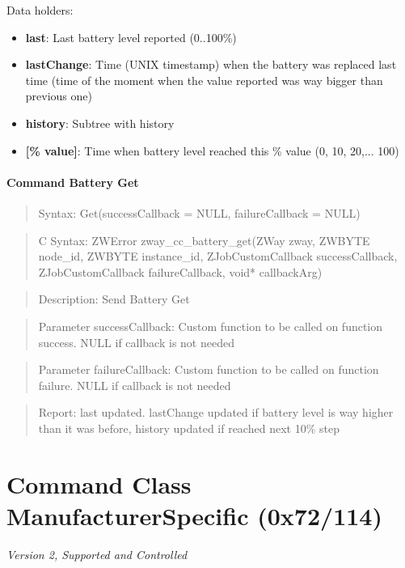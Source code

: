\noindent
Data holders:

\begin{itemize}
\item \textbf{last}: Last battery level reported (0..100\%)
\item \textbf{lastChange}: Time (UNIX timestamp) when the battery was replaced last time (time of the moment when the value reported was way bigger than previous one)
\item \textbf{history}: Subtree with history
\item \qquad\textbf{[\% value]}: Time when battery level reached this \% value (0, 10, 20,... 100)
\end{itemize}

\paragraph{Command Battery Get}
\begin{quote}Syntax: Get(successCallback = NULL, failureCallback = NULL)\end{quote}
\begin{quote}C Syntax: ZWError zway\_cc\_battery\_get(ZWay zway, ZWBYTE node\_id, ZWBYTE instance\_id, ZJobCustomCallback successCallback, ZJobCustomCallback failureCallback, void* callbackArg)\end{quote}
\begin{quote}Description: Send Battery Get\end{quote}
\begin{quote}Parameter successCallback: Custom function to be called on function success. NULL if callback is not needed\end{quote}
\begin{quote}Parameter failureCallback: Custom function to be called on function failure. NULL if callback is not needed\end{quote}
\begin{quote}Report: last updated. lastChange updated if battery level is way higher than it was before, history updated if reached next 10\% step\end{quote}


\section{Command Class ManufacturerSpecific (0x72/114)}

\textit{Version 2, Supported and Controlled}
\newline

